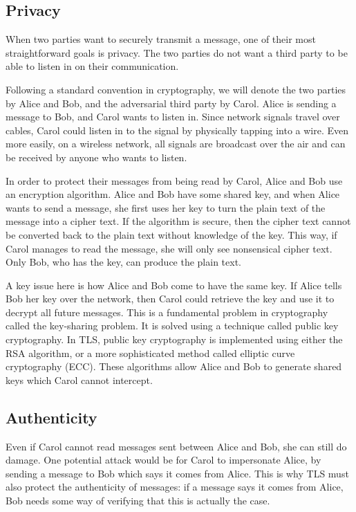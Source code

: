 \subsection{Privacy}

When two parties want to securely transmit a message, one of their most straightforward goals is privacy. The two parties do not want a third party to be able to listen in on their communication.

Following a standard convention in cryptography, we will denote the two parties by Alice and Bob, and the adversarial third party by Carol. Alice is sending a message to Bob, and Carol wants to listen in. Since network signals travel over cables, Carol could listen in to the signal by physically tapping into a wire. Even more easily, on a wireless network, all signals are broadcast over the air and can be received by anyone who wants to listen.

In order to protect their messages from being read by Carol, Alice and Bob use an encryption algorithm. Alice and Bob have some shared key, and when Alice wants to send a message, she first uses her key to turn the plain text of the message into a cipher text. If the algorithm is secure, then the cipher text cannot be converted back to the plain text without knowledge of the key. This way, if Carol manages to read the message, she will only see nonsensical cipher text. Only Bob, who has the key, can produce the plain text.

A key issue here is how Alice and Bob come to have the same key. If Alice tells Bob her key over the network, then Carol could retrieve the key and use it to decrypt all future messages. This is a fundamental problem in cryptography called the key-sharing problem. It is solved using a technique called public key cryptography. In TLS, public key cryptography is implemented using either the RSA algorithm, or a more sophisticated method called elliptic curve cryptography (ECC). These algorithms allow Alice and Bob to generate shared keys which Carol cannot intercept.

\subsection{Authenticity}

Even if Carol cannot read messages sent between Alice and Bob, she can still do damage. One potential attack would be for Carol to impersonate Alice, by sending a message to Bob which says it comes from Alice. This is why TLS must also protect the authenticity of messages: if a message says it comes from Alice, Bob needs some way of verifying that this is actually the case.

